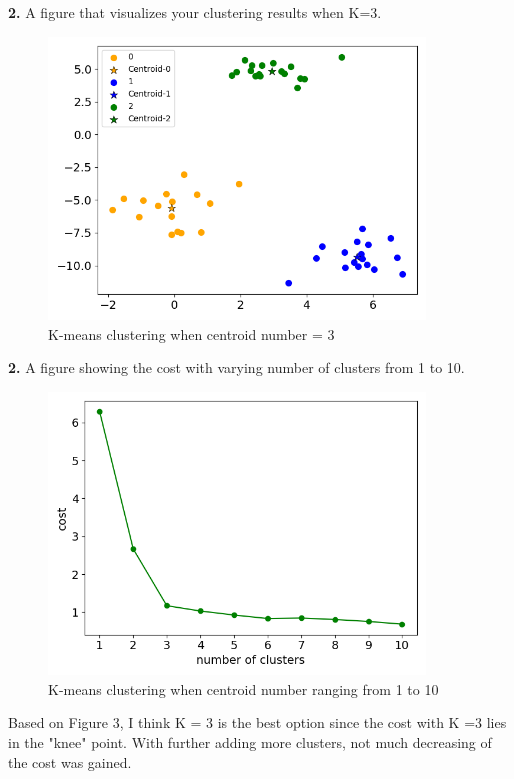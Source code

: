 \textbf{2.} A figure that visualizes your clustering results when K=3.
\begin{figure}[H]
    \centering
    \includegraphics[width=100mm]{task2-cennum3.png}
    \caption{K-means clustering when centroid number = 3}
    \label{fig:task2-1}
\end{figure}

\textbf{2.} A figure showing the cost with varying number of clusters from 1 to 10.
\begin{figure}[H]
    \centering
    \includegraphics[width=100mm]{task2-cluster-numbers.png}
    \caption{K-means clustering when centroid number ranging from 1 to 10}
    \label{fig:task2-2}
\end{figure}

Based on Figure 3, I think K = 3 is the best option since the cost with K =3 lies in the "knee" point. With further adding more clusters, not much decreasing of the cost was gained.

